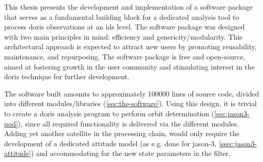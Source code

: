 \iffalse
Within the framework of this Thesis, a software package was designed and implemented from scratch, 
with the aim of acting as a fundamental building block for a state-of-the-art, \gls{ids} 
level, dedicated analysis tool for processing \gls{doris} observations. The design 
principle adopted was twofold, based on efficiency on the one hand and on the same time 
allowing for genericity and modularity. This architectural approach will hopefully 
attract new users, since it favors reusability, maintenance and repurposing. The software 
package is free and open-source, a policy adopted to further aid the growth of the 
user community and in turn boost interest in the technique and thus accommodate further 
developments.
\fi
This thesis presents the development and implementation of a software package 
that serves as a fundamental building block for a dedicated analysis tool to 
process \gls{doris} observations at an \gls{ids} level. The software package 
was designed with two main principles in mind: efficiency and genericity/modularity. 
This architectural approach is expected to attract new users by promoting 
reusability, maintenance, and repurposing. The software package is free and open-source, 
aimed at fostering growth in the user community and stimulating interest in the 
\gls{doris} technique for further development.

The software built amounts to approximately 100000 lines of source code, divided into 
different modules/libraries (\autoref{sec:the-software}). Using this design, it is 
trivial to create a \gls{doris} analysis program to perform orbit determination 
(\autoref{sec:jason3-pod}), since all required functionality is delivered via the 
different modules. Adding yet another satellite in the processing chain, would only 
require the development of a dedicated attitude model (as e.g. done for \gls{jason}-3, \autoref{ssec:jason3-attitude}) 
and accommodating for the new state parameters in the filter.


